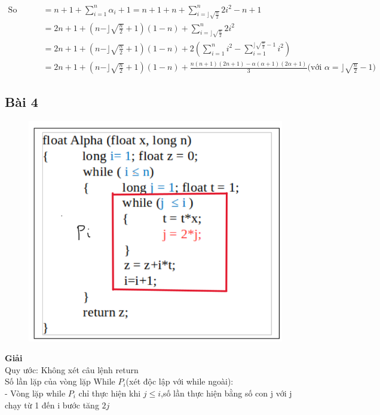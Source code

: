 \documentclass[10pt,a4paper]{article}
\begin{document}
    \begin{align*}
        \text{So sánh(n)}
            & = n + 1 + \sum_{i=1}^{n}{\alpha_i+1} 
              = n + 1 + n + \sum_{i=\rfloor\sqrt{\frac{n}{2}}}^{n}{2i^2-n+1} \\
            & = 2n + 1 + (n-\rfloor\sqrt{\frac{n}{2}}+1)(1-n) + \sum_{i=\rfloor\sqrt{\frac{n}{2}}}^{n}{2i^2} \\
            & = 2n + 1 + (n-\rfloor\sqrt{\frac{n}{2}}+1)(1-n) + 2(\sum_{i=1}^{n}{i^2} - \sum_{i=1}^{\rfloor\sqrt{\frac{n}{2}}-1}{i^2}) \\
            & = 2n + 1 + (n-\rfloor\sqrt{\frac{n}{2}}+1)(1-n) + \frac{n(n+1)(2n+1)-\alpha(\alpha+1)(2\alpha+1)}{3}
            \text{(với $\alpha = \rfloor\sqrt{\frac{n}{2}}-1$)}
    \end{align*}
\subsection*{Bài 4} %
    \begin{figure}[H]
        \centering\includegraphics[scale=.6]{images/Bai4.png} \\
    \end{figure} 
    \textbf{Giải}\\
    Quy ước: Không xét câu lệnh return\\
    Số lần lặp của vòng lặp While $P_i$(xét độc lập với while ngoài): \\
    - Vòng lặp while $P_i$ chỉ thực hiện khi $j \leq i$,số lần thực hiện bằng số con j với j chạy từ 1 đến i bước tăng $2j$\\
\end{document}
